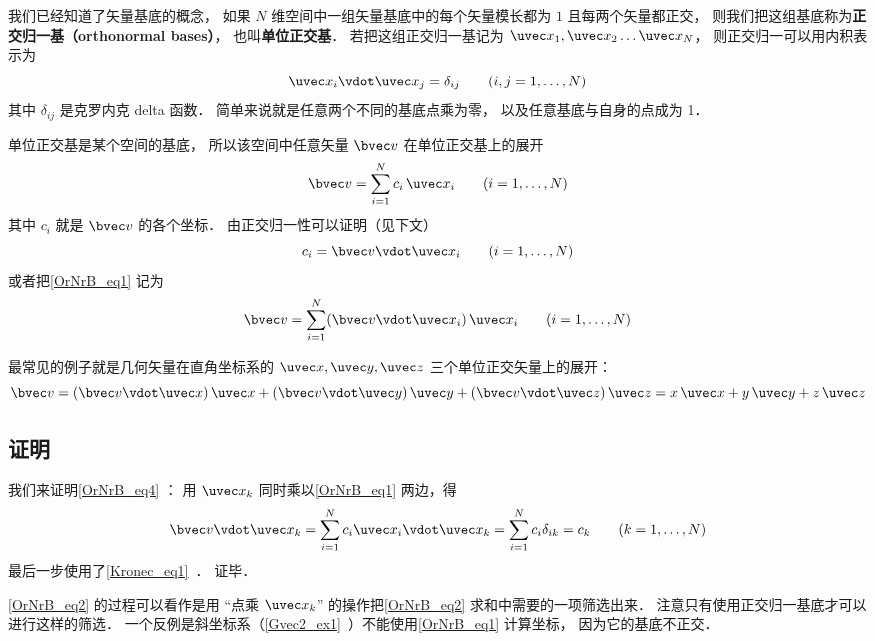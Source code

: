 

我们已经知道了矢量基底的概念， 如果 $N$ 维空间中一组矢量基底中的每个矢量模长都为 $1$ 且每两个矢量都正交， 则我们把这组基底称为\textbf{正交归一基（orthonormal bases）}， 也叫\textbf{单位正交基}． 若把这组正交归一基记为 $\uvec x_1,\uvec x_2\dots\uvec x_N$， 则正交归一可以用内积表示为
\begin{equation}\label{OrNrB_eq3}
\uvec x_i \vdot \uvec x_j = \delta_{ij} \qquad (i,j = 1,\dots, N)
\end{equation}
其中 $\delta_{ij}$ 是克罗内克 delta 函数． 简单来说就是任意两个不同的基底点乘为零， 以及任意基底与自身的点成为 1．

单位正交基是某个空间的基底， 所以该空间中任意矢量 $\bvec v$ 在单位正交基上的展开
\begin{equation}\label{OrNrB_eq1}
\bvec v = \sum_{i = 1}^N c_i \,\uvec x_i \qquad (i = 1,\dots, N)
\end{equation}
其中 $c_i$ 就是 $\bvec v$ 的各个坐标． 由正交归一性可以证明（见下文）
\begin{equation}\label{OrNrB_eq4}
c_i = \bvec v\vdot\uvec x_i \qquad (i = 1,\dots, N)
\end{equation}
或者把\autoref{OrNrB_eq1} 记为
\begin{equation}\label{OrNrB_eq5}
\bvec v = \sum_{i = 1}^N (\bvec v\vdot\uvec x_i) \,\uvec x_i \qquad (i = 1,\dots, N)
\end{equation}

最常见的例子就是几何矢量在直角坐标系的 $\uvec x, \uvec y, \uvec z$ 三个单位正交矢量上的展开：
\begin{equation}
\bvec v = (\bvec v \vdot \uvec x)\,\uvec x + (\bvec v \vdot \uvec y)\,\uvec y + (\bvec v \vdot \uvec z)\,\uvec z = x \,\uvec x + y \,\uvec y + z \,\uvec z
\end{equation} 

\subsection{证明}
我们来证明\autoref{OrNrB_eq4} ： 用 $\uvec x_k$ 同时乘以\autoref{OrNrB_eq1} 两边，得
\begin{equation}\label{OrNrB_eq2}
\bvec v \vdot \uvec x_k = \sum_{i = 1}^N  c_i \uvec x_i \vdot\uvec x_k = \sum_{i = 1}^N c_i \delta_{ik}  = c_k \qquad (k = 1, \dots, N)
\end{equation}
最后一步使用了\autoref{Kronec_eq1}~． 证毕．

\autoref{OrNrB_eq2} 的过程可以看作是用 “点乘 $\uvec x_k$” 的操作把\autoref{OrNrB_eq2} 求和中需要的一项筛选出来． 注意只有使用正交归一基底才可以进行这样的筛选． 一个反例是斜坐标系（\autoref{Gvec2_ex1}~）不能使用\autoref{OrNrB_eq1} 计算坐标， 因为它的基底不正交．
